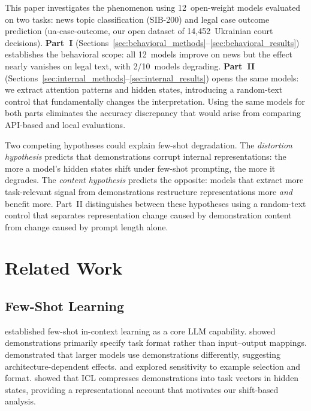 \documentclass[11pt,a4paper]{article}
\begin{document}
This paper investigates the phenomenon using 12~open-weight models evaluated on two tasks: news topic classification (SIB-200) and legal case outcome prediction (ua-case-outcome, our open dataset of 14,452~Ukrainian court decisions). \textbf{Part~I} (Sections~\ref{sec:behavioral_methods}--\ref{sec:behavioral_results}) establishes the behavioral scope: all 12~models improve on news but the effect nearly vanishes on legal text, with 2/10~models degrading. \textbf{Part~II} (Sections~\ref{sec:internal_methods}--\ref{sec:internal_results}) opens the same models: we extract attention patterns and hidden states, introducing a random-text control that fundamentally changes the interpretation. Using the same models for both parts eliminates the accuracy discrepancy that would arise from comparing API-based and local evaluations.

Two competing hypotheses could explain few-shot degradation. The \emph{distortion hypothesis} predicts that demonstrations corrupt internal representations: the more a model's hidden states shift under few-shot prompting, the more it degrades. The \emph{content hypothesis} predicts the opposite: models that extract more task-relevant signal from demonstrations restructure representations more \emph{and} benefit more. Part~II distinguishes between these hypotheses using a random-text control that separates representation change caused by demonstration content from change caused by prompt length alone.

\section{Related Work}

\subsection{Few-Shot Learning}

\citet{brown2020language} established few-shot in-context learning as a core LLM capability. \citet{min2022rethinking} showed demonstrations primarily specify task format rather than input--output mappings. \citet{wei2023larger} demonstrated that larger models use demonstrations differently, suggesting architecture-dependent effects. \citet{zhao2021calibrate} and \citet{liu2022makes} explored sensitivity to example selection and format. \citet{hendel2023icl} showed that ICL compresses demonstrations into task vectors in hidden states, providing a representational account that motivates our shift-based analysis.
\end{document}

